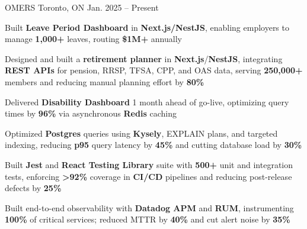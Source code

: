 \documentclass[11pt, a4paper]{awesome-cv}
\begin{document}
\makecvheader[C]


\begin{cventries}


  \cventry
    {\color{lightblue}{ASSOCIATE FULL-STACK ENGINEER}}
    {OMERS}
    {Toronto, ON}
    {Jan. 2025 -- Present}
    {
      \begin{cvitems}
        \item{Built \textbf{Leave Period Dashboard} in \textbf{Next.js/NestJS}, enabling employers to manage \textbf{1,000+} leaves, routing \textbf{\$1M+} annually}
        \item{Designed and built a \textbf{retirement planner} in \textbf{Next.js}/\textbf{NestJS}, integrating \textbf{REST APIs} for pension, RRSP, TFSA, CPP, and OAS data, serving \textbf{250,000+} members and reducing manual planning effort by \textbf{80\%}}
        \item{Delivered \textbf{Disability Dashboard} 1 month ahead of go-live, optimizing query times by \textbf{96\%} via asynchronous \textbf{Redis} caching}
        \item{Optimized \textbf{Postgres} queries using \textbf{Kysely}, EXPLAIN plans, and targeted indexing, reducing \textbf{p95} query latency by \textbf{45\%} and cutting database load by \textbf{30\%}}
        \item{Built \textbf{Jest} and \textbf{React Testing Library} suite with \textbf{500+} unit and integration tests, enforcing \textbf{>92\%} coverage in \textbf{CI/CD} pipelines and reducing post-release defects by \textbf{25\%}}
        \item{Built end-to-end observability with \textbf{Datadog APM} and \textbf{RUM}, instrumenting \textbf{100\%} of critical services; reduced MTTR by \textbf{40\%} and cut alert noise by \textbf{35\%}}
      \end{cvitems}
    }

  \vspace{3mm}


\end{cventries}
\end{document}

